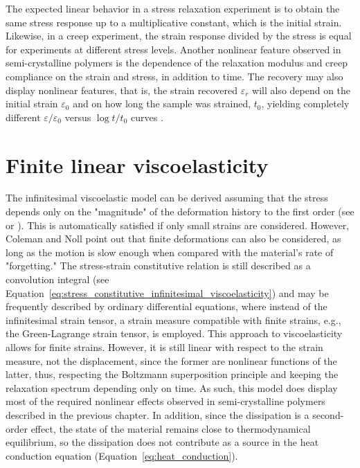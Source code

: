 The expected linear behavior in a stress relaxation experiment is to obtain the same stress response up to a multiplicative constant, which is the initial strain.
Likewise, in a creep experiment, the strain response divided by the stress is equal for experiments at different stress levels.
Another nonlinear feature observed in semi-crystalline polymers is the dependence of the relaxation modulus and creep compliance on the strain and stress, in addition to time.
The recovery may also display nonlinear features, that is, the strain recovered $\varepsilon_r$ will also depend on the initial strain $\varepsilon_0$ and on how long the sample was strained, $t_0$, yielding completely different $\varepsilon/\varepsilon_0$ versus $\log t/t_0$ curves \citep{ferryViscoelasticPropertiesPolymers1980}.


\section{Finite linear viscoelasticity}
The infinitesimal viscoelastic model can be derived assuming that the stress depends only on the "magnitude" of the deformation history to the first order (see \cite{colemanFoundationsLinearViscoelasticity1961} or \cite{christensen2013theory}).
This is automatically satisfied if only small strains are considered.
However, Coleman and Noll \citep{colemanFoundationsLinearViscoelasticity1961} point out that finite deformations can also be considered, as long as the motion is slow enough when compared with the material's rate of "forgetting."
The stress-strain constitutive relation is still described as a convolution integral (see Equation~\eqref{eq:stress_constitutive_infinitesimal_viscoelasticity}) and may be frequently described by ordinary differential equations, where instead of the infinitesimal strain tensor, a strain measure compatible with finite strains, e.g., the Green-Lagrange strain tensor, is employed.
This approach to viscoelasticity allows for finite strains.
However, it is still linear with respect to the strain measure, not the displacement, since the former are nonlinear functions of the latter, thus, respecting the Boltzmann superposition principle and keeping the relaxation spectrum depending only on time.
As such, this model does display most of the required nonlinear effects observed in semi-crystalline polymers described in the previous chapter.
In addition, since the dissipation is a second-order effect, the state of the material remains close to thermodynamical equilibrium, so the dissipation does not contribute as a source in the heat conduction equation (Equation~\eqref{eq:heat_conduction}).

